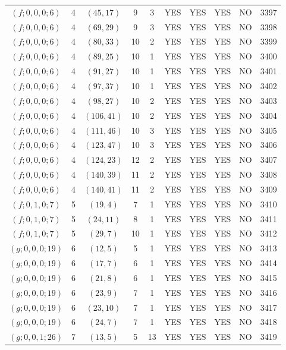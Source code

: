 \begin{longtable}{|c|c|c|c|c|c|c|c|c|c|}
$(f; 0, 0, 0; 6)$ & 4 & $(45, 17)$ & 9 & 3 & YES & YES & YES & NO & 3397\\
$(f; 0, 0, 0; 6)$ & 4 & $(69, 29)$ & 9 & 3 & YES & YES & YES & NO & 3398\\
$(f; 0, 0, 0; 6)$ & 4 & $(80, 33)$ & 10 & 2 & YES & YES & YES & NO & 3399\\
$(f; 0, 0, 0; 6)$ & 4 & $(89, 25)$ & 10 & 1 & YES & YES & YES & NO & 3400\\
$(f; 0, 0, 0; 6)$ & 4 & $(91, 27)$ & 10 & 1 & YES & YES & YES & NO & 3401\\
$(f; 0, 0, 0; 6)$ & 4 & $(97, 37)$ & 10 & 1 & YES & YES & YES & NO & 3402\\
$(f; 0, 0, 0; 6)$ & 4 & $(98, 27)$ & 10 & 2 & YES & YES & YES & NO & 3403\\
$(f; 0, 0, 0; 6)$ & 4 & $(106, 41)$ & 10 & 2 & YES & YES & YES & NO & 3404\\
$(f; 0, 0, 0; 6)$ & 4 & $(111, 46)$ & 10 & 3 & YES & YES & YES & NO & 3405\\
$(f; 0, 0, 0; 6)$ & 4 & $(123, 47)$ & 10 & 3 & YES & YES & YES & NO & 3406\\
$(f; 0, 0, 0; 6)$ & 4 & $(124, 23)$ & 12 & 2 & YES & YES & YES & NO & 3407\\
$(f; 0, 0, 0; 6)$ & 4 & $(140, 39)$ & 11 & 2 & YES & YES & YES & NO & 3408\\
$(f; 0, 0, 0; 6)$ & 4 & $(140, 41)$ & 11 & 2 & YES & YES & YES & NO & 3409\\
$(f; 0, 1, 0; 7)$ & 5 & $(19, 4)$ & 7 & 1 & YES & YES & YES & NO & 3410\\
$(f; 0, 1, 0; 7)$ & 5 & $(24, 11)$ & 8 & 1 & YES & YES & YES & NO & 3411\\
$(f; 0, 1, 0; 7)$ & 5 & $(29, 7)$ & 10 & 1 & YES & YES & YES & NO & 3412\\
$(g; 0, 0, 0; 19)$ & 6 & $(12, 5)$ & 5 & 1 & YES & YES & YES & NO & 3413\\
$(g; 0, 0, 0; 19)$ & 6 & $(17, 7)$ & 6 & 1 & YES & YES & YES & NO & 3414\\
$(g; 0, 0, 0; 19)$ & 6 & $(21, 8)$ & 6 & 1 & YES & YES & YES & NO & 3415\\
$(g; 0, 0, 0; 19)$ & 6 & $(23, 9)$ & 7 & 1 & YES & YES & YES & NO & 3416\\
$(g; 0, 0, 0; 19)$ & 6 & $(23, 10)$ & 7 & 1 & YES & YES & YES & NO & 3417\\
$(g; 0, 0, 0; 19)$ & 6 & $(24, 7)$ & 7 & 1 & YES & YES & YES & NO & 3418\\
$(g; 0, 0, 1; 26)$ & 7 & $(13, 5)$ & 5 & 13 & YES & YES & YES & NO & 3419\\

\end{longtable}
